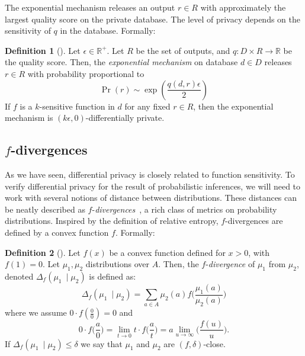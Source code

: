 \documentclass{sig-alternate-05-2015}
\theoremstyle{plain}
\theoremstyle{definition}
\newtheorem{definition}{Definition}[section]
\theoremstyle{corollary}
\def\R{\mathbb{R}}
\newcommand{\rplus}{\R^+}
\newcommand{\fdiv}{\ensuremath{f}}
\begin{document}
The exponential mechanism releases an output $r \in R$ with approximately the
largest quality score on the private database. The level of privacy depends on
the sensitivity of $q$ in the database. Formally:

\begin{definition}[\citet{MT07}]
  Let $\epsilon \in \rplus$. Let $R$ be the set of outputs, and $q :
  D \times R \to \mathbb{R}$ be the quality score. Then, the \emph{exponential
    mechanism} on database $d \in D$ releases $r \in R$ with probability
  proportional to
  \[
    \Pr(r) \sim \exp\left( \frac{q(d, r) \epsilon}{2} \right)
  \]
  If $f$ is a $k$-sensitive function in $d$ for any fixed $r \in R$, then the
  exponential mechanism is $(k\epsilon, 0)$-differentially private.
\end{definition}


\subsection{\fdiv-divergences}
As we have seen, differential privacy is closely related to function
sensitivity. To verify differential privacy for the result of probabilistic
inferences, we will need to work with several notions of distance between
distributions. These distances can be neatly described as
\fdiv-\emph{divergences}~\citep{csiszar63}, a rich class of metrics on
probability distributions. Inspired by the definition of relative entropy,
\fdiv-divergences are defined by a convex function \fdiv.  Formally:
\begin{definition}[\citet{csiszarS04}]
\label{def:f-div}
  Let $\fdiv(x)$ be a convex function defined for $x>0$, with
  $\fdiv(1)=0$. Let $\mu_1,\mu_2$ distributions over $A$. Then, the \fdiv-\emph{divergence} of $\mu_1$
  from $\mu_2$, denoted $\Delta_\fdiv(\mu_1\ \mid \mu_2)$ is defined as:
$$
\Delta_\fdiv(\mu_1\ \mid \mu_2)=\sum_{a\in A}\mu_2(a)\fdiv\Big
(\frac{\mu_1(a)}{\mu_2(a)}\Big )
$$  
where we assume $0 \cdot \fdiv(\frac{0}{0})=0$ and
$$0 \cdot \fdiv\Big (\frac{a}{0}\Big )=\lim_{t\to 0}t \cdot \fdiv\Big
(\frac{a}{t}\Big )=a\lim_{u\to \infty}\Big (\frac{\fdiv(u)}{u}\Big ).$$
If $\Delta_\fdiv(\mu_1\ \mid \mu_2)\leq \delta$ we say that $\mu_1$ and
$\mu_2$ are $(\fdiv,\delta)$-close.
\end{definition}
\end{document}
